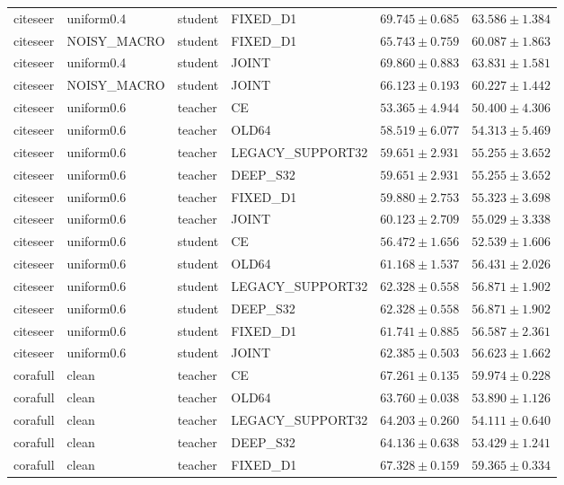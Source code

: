 \begin{longtable}{llllrr}
citeseer & uniform0.4 & student & FIXED\_D1 & $69.745 \pm 0.685$ & $63.586 \pm 1.384$ \\
citeseer & NOISY\_MACRO & student & FIXED\_D1 & $65.743 \pm 0.759$ & $60.087 \pm 1.863$ \\
citeseer & uniform0.4 & student & JOINT & $69.860 \pm 0.883$ & $63.831 \pm 1.581$ \\
citeseer & NOISY\_MACRO & student & JOINT & $66.123 \pm 0.193$ & $60.227 \pm 1.442$ \\
citeseer & uniform0.6 & teacher & CE & $53.365 \pm 4.944$ & $50.400 \pm 4.306$ \\
citeseer & uniform0.6 & teacher & OLD64 & $58.519 \pm 6.077$ & $54.313 \pm 5.469$ \\
citeseer & uniform0.6 & teacher & LEGACY\_SUPPORT32 & $59.651 \pm 2.931$ & $55.255 \pm 3.652$ \\
citeseer & uniform0.6 & teacher & DEEP\_S32 & $59.651 \pm 2.931$ & $55.255 \pm 3.652$ \\
citeseer & uniform0.6 & teacher & FIXED\_D1 & $59.880 \pm 2.753$ & $55.323 \pm 3.698$ \\
citeseer & uniform0.6 & teacher & JOINT & $60.123 \pm 2.709$ & $55.029 \pm 3.338$ \\
citeseer & uniform0.6 & student & CE & $56.472 \pm 1.656$ & $52.539 \pm 1.606$ \\
citeseer & uniform0.6 & student & OLD64 & $61.168 \pm 1.537$ & $56.431 \pm 2.026$ \\
citeseer & uniform0.6 & student & LEGACY\_SUPPORT32 & $62.328 \pm 0.558$ & $56.871 \pm 1.902$ \\
citeseer & uniform0.6 & student & DEEP\_S32 & $62.328 \pm 0.558$ & $56.871 \pm 1.902$ \\
citeseer & uniform0.6 & student & FIXED\_D1 & $61.741 \pm 0.885$ & $56.587 \pm 2.361$ \\
citeseer & uniform0.6 & student & JOINT & $62.385 \pm 0.503$ & $56.623 \pm 1.662$ \\
corafull & clean & teacher & CE & $67.261 \pm 0.135$ & $59.974 \pm 0.228$ \\
corafull & clean & teacher & OLD64 & $63.760 \pm 0.038$ & $53.890 \pm 1.126$ \\
corafull & clean & teacher & LEGACY\_SUPPORT32 & $64.203 \pm 0.260$ & $54.111 \pm 0.640$ \\
corafull & clean & teacher & DEEP\_S32 & $64.136 \pm 0.638$ & $53.429 \pm 1.241$ \\
corafull & clean & teacher & FIXED\_D1 & $67.328 \pm 0.159$ & $59.365 \pm 0.334$ \\

\end{longtable}
